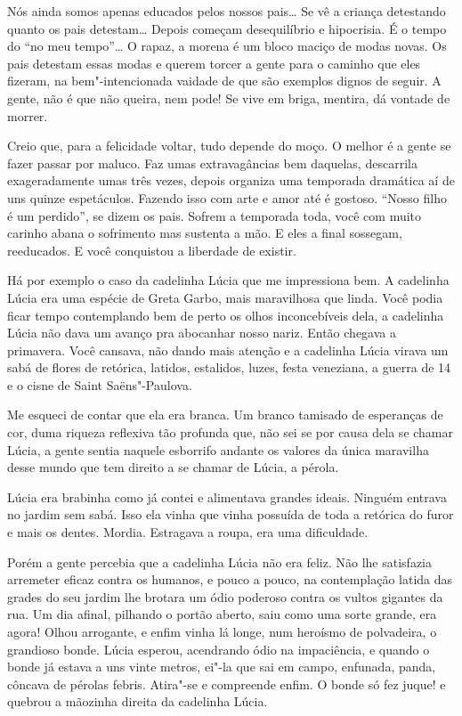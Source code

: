 Nós ainda somos apenas educados pelos nossos pais\ldots{} Se vê a criança
detestando quanto os pais detestam\ldots{} Depois começam desequilíbrio e
hipocrisia. É o tempo do ``no meu tempo''\ldots{} O rapaz, a morena é um
bloco maciço de modas novas. Os pais detestam essas modas e querem
torcer a gente para o caminho que eles fizeram, na bem"-intencionada
vaidade de que são exemplos dignos de seguir. A gente, não é que não
queira, nem pode! Se vive em briga, mentira, dá vontade de morrer.

Creio que, para a felicidade voltar, tudo depende do moço. O melhor é a
gente se fazer passar por maluco. Faz umas extravagâncias bem daquelas,
descarrila exageradamente umas três vezes, depois organiza uma temporada
dramática aí de uns quinze espetáculos. Fazendo isso com arte e amor até
é gostoso. ``Nosso filho é um perdido'', se dizem os pais. Sofrem a
temporada toda, você com muito carinho abana o sofrimento mas sustenta a
mão. E eles a final sossegam, reeducados. E você conquistou a liberdade
de existir.

Há por exemplo o caso da cadelinha Lúcia que me impressiona bem. A
cadelinha Lúcia era uma espécie de Greta Garbo, mais maravilhosa que
linda. Você podia ficar tempo contemplando bem de perto os olhos
inconcebíveis dela, a cadelinha Lúcia não dava um avanço pra abocanhar
nosso nariz. Então chegava a primavera. Você cansava, não dando mais
atenção e a cadelinha Lúcia virava um sabá de flores de retórica,
latidos, estalidos, luzes, festa veneziana, a guerra de 14 e o cisne de
Saint Saëns"-Paulova.

Me esqueci de contar que ela era branca. Um branco tamisado de
esperanças de cor, duma riqueza reflexiva tão profunda que, não sei se
por causa dela se chamar Lúcia, a gente sentia naquele esborrifo andante
os valores da única maravilha desse mundo que tem direito a se chamar de
Lúcia, a pérola.

Lúcia era brabinha como já contei e alimentava grandes ideais. Ninguém
entrava no jardim sem sabá. Isso ela vinha que vinha possuída de toda a
retórica do furor e mais os dentes. Mordia. Estragava a roupa, era uma
dificuldade.

Porém a gente percebia que a cadelinha Lúcia não era feliz. Não lhe
satisfazia arremeter eficaz contra os humanos, e pouco a pouco, na
contemplação latida das grades do seu jardim lhe brotara um ódio
poderoso contra os vultos gigantes da rua. Um dia afinal, pilhando o
portão aberto, saiu como uma sorte grande, era agora! Olhou arrogante, e
enfim vinha lá longe, num heroísmo de polvadeira, o grandioso bonde.
Lúcia esperou, acendrando ódio na impaciência, e quando o bonde já
estava a uns vinte metros, ei"-la que sai em campo, enfunada, panda,
côncava de pérolas febris. Atira"-se e compreende enfim. O bonde só fez
juque! e quebrou a mãozinha direita da cadelinha Lúcia.

